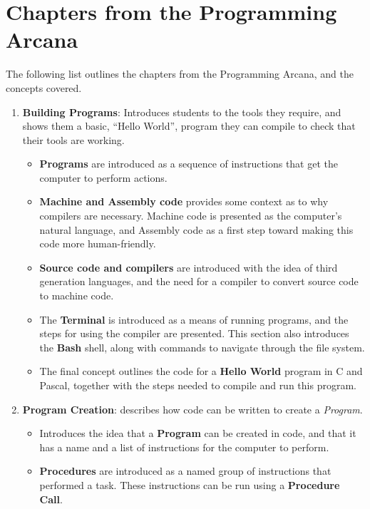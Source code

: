 
\chapter{Chapters from the Programming Arcana} %
\label{cha:chapters_from_the_programming_arcana}

The following list outlines the chapters from the Programming Arcana, and the concepts covered.

\begin{enumerate}
  \item \textbf{Building Programs}: Introduces students to the tools they require, and shows them a basic, ``Hello World'', program they can compile to check that their tools are working.
  \begin{itemize}[noitemsep,nolistsep]
    \item \textbf{Programs} are introduced as a sequence of instructions that get the computer to perform actions.
    \item \textbf{Machine and Assembly code} provides some context as to why compilers are necessary. Machine code is presented as the computer's natural language, and Assembly code as a first step toward making this code more human-friendly.
    \item \textbf{Source code and compilers} are introduced with the idea of third generation languages, and the need for a compiler to convert source code to machine code.
    \item The \textbf{Terminal} is introduced as a means of running programs, and the steps for using the compiler are presented. This section also introduces the \textbf{Bash} shell, along with commands to navigate through the file system. 
    \item The final concept outlines the code for a \textbf{Hello World} program in C and Pascal, together with the steps needed to compile and run this program. 
  \end{itemize}
  \item \textbf{Program Creation}: describes how code can be written to create a \emph{Program}.
  \begin{itemize}[noitemsep,nolistsep]
    \item Introduces the idea that a \textbf{Program} can be created in code, and that it has a name and a list of instructions for the computer to perform.
    \item \textbf{Procedures} are introduced as a named group of instructions that performed a task. These instructions can be run using a \textbf{Procedure Call}.

\end{itemize}
\end{enumerate}
